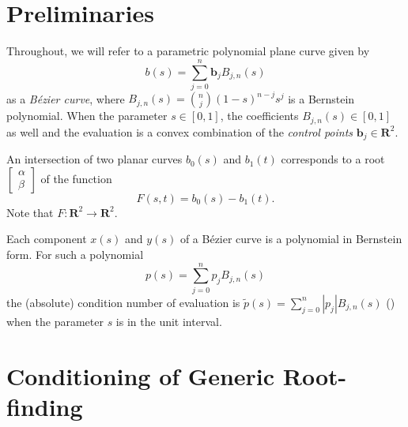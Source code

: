 \documentclass[3p, authoryear, square]{elsarticle}
\theoremstyle{definition}
\newcommand{\reals}{\mathbf{R}}
\begin{document}
\section{Preliminaries}

Throughout, we will refer to a parametric polynomial
plane curve given by
\begin{equation}
b(s) = \sum_{j = 0}^n \bm{b}_j B_{j, n}(s)
\end{equation}
as a \emph{B\'{e}zier curve},
where \(B_{j, n}(s) = \binom{n}{j} (1 - s)^{n - j} s^j\) is a Bernstein
polynomial.
When the parameter \(s \in \left[0, 1\right]\), the coefficients
\(B_{j, n}(s) \in \left[0, 1\right]\) as well and the evaluation is a convex
combination of the \emph{control points} \(\bm{b}_j \in \reals^2\).

An intersection of two planar curves \(b_0(s)\) and \(b_1(t)\) corresponds to
a root \(\left[\begin{array}{c}
\alpha \\ \beta \end{array}\right]\) of the function
\begin{equation}
F(s, t) = b_0(s) - b_1(t).
\end{equation}
Note that
\(F: \reals^2 \longrightarrow \reals^2\).

Each component \(x(s)\) and \(y(s)\) of a B\'{e}zier curve is a
polynomial in Bernstein form. For such a polynomial
\begin{equation}
p(s) = \sum_{j = 0}^n p_j B_{j, n}(s)
\end{equation}
the (absolute) condition number of evaluation is
\(\widetilde{p}(s) = \sum_{j = 0}^n \left|p_j\right| B_{j, n}(s)\)
(\cite{Farouki1987}) when the parameter \(s\) is in the unit interval.

\section{Conditioning of Generic Root-finding}\label{sec:generic}
\end{document}

